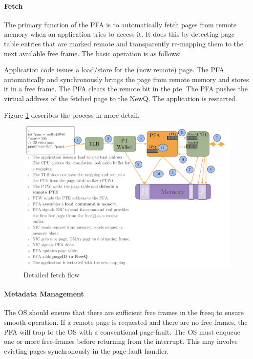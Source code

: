 \FloatBarrier

\paragraph{Fetch}
The primary function of the PFA is to automatically fetch pages from remote
memory when an application tries to access it. It does this by detecting page
table entries that are marked remote and transparently re-mapping them to the
next available free frame. The basic operation is as follows: 

\begin{outline}[enumerate]
    \1 Application code issues a load/store for the (now remote) page.
    \1 The PFA automatically and synchronously brings the page from remote
       memory and stores it in a free frame.
    \1 The PFA clears the remote bit in the \gls{pte}.
    \1 The PFA pushes the virtual address of the fetched page to the NewQ.
    \1 The application is restarted.
\end{outline}

Figure \ref{fig:fetch_detail} describes the process in more detail.
\begin{figure}[h] \centering
  \includegraphics[width=\columnwidth]{figs/pfa_fetch_detail.pdf}
  \vspace{-5mm}
  \caption{Detailed fetch flow}
  \label{fig:fetch_detail}
\end{figure}
\FloatBarrier

\paragraph{Metadata Management}
The OS should ensure that there are sufficient free frames in the \gls{freeq} to
ensure smooth operation. If a remote page is requested and there are no free
frames, the PFA will trap to the OS with a conventional page-fault. The OS must
enqueue one or more free-frames before returning from the interrupt. This may
involve evicting pages synchronously in the page-fault handler.

